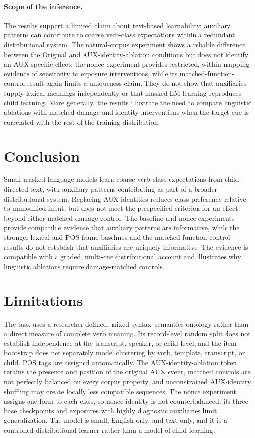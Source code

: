 \documentclass[11pt]{article}
\begin{document}
\paragraph{Scope of the inference.}
The results support a limited claim about text-based learnability: auxiliary patterns can contribute to coarse verb-class expectations within a redundant distributional system. The natural-corpus experiment shows a reliable difference between the Original and AUX-identity-ablation conditions but does not identify an AUX-specific effect; the nonce experiment provides restricted, within-mapping evidence of sensitivity to exposure interventions, while its matched-function-control result again limits a uniqueness claim. They do not show that auxiliaries supply lexical meanings independently or that masked-LM learning reproduces child learning. More generally, the results illustrate the need to compare linguistic ablations with matched-damage and identity interventions when the target cue is correlated with the rest of the training distribution.

\section{Conclusion}

Small masked language models learn coarse verb-class expectations from child-directed text, with auxiliary patterns contributing as part of a broader distributional system. Replacing AUX identities reduces class preference relative to unmodified input, but does not meet the prespecified criterion for an effect beyond either matched-damage control. The baseline and nonce experiments provide compatible evidence that auxiliary patterns are informative, while the stronger lexical and POS-frame baselines and the matched-function-control results do not establish that auxiliaries are uniquely informative. The evidence is compatible with a graded, multi-cue distributional account and illustrates why linguistic ablations require damage-matched controls.

\section*{Limitations}

The task uses a researcher-defined, mixed syntax--semantics ontology rather than a direct measure of complete verb meaning. Its record-level random split does not establish independence at the transcript, speaker, or child level, and the item bootstrap does not separately model clustering by verb, template, transcript, or child. POS tags are assigned automatically. The AUX-identity-ablation token retains the presence and position of the original AUX event, matched controls are not perfectly balanced on every corpus property, and unconstrained AUX-identity shuffling may create locally less compatible sequences. The nonce experiment assigns one form to each class, so nonce identity is not counterbalanced; its three base checkpoints and exposures with highly diagnostic auxiliaries limit generalization. The model is small, English-only, and text-only, and it is a controlled distributional learner rather than a model of child learning.
\end{document}
